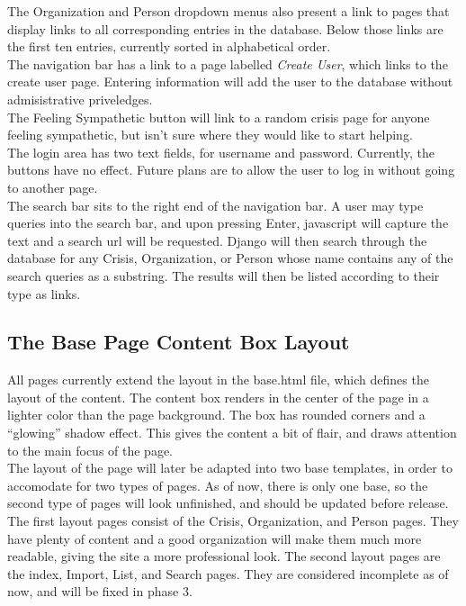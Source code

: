 \documentclass[12pt]{report}
\begin{document}
The Organization and Person dropdown menus also present a link to pages
that display links to all corresponding entries in the database.
Below those links are the first ten entries, currently sorted in alphabetical order.
\\


The navigation bar has a link to a page labelled \emph{Create User}, which links to the
create user page.  Entering information will add the user to the database without
admisistrative priveledges.
\\


The Feeling Sympathetic button will link to a random crisis page for anyone feeling sympathetic,
but isn't sure where they would like to start helping.
\\


The login area has two text fields, for username and password.
Currently, the buttons have no effect.
Future plans are to allow the user to log in without going to another page.
\\


The search bar sits to the right end of the navigation bar.
A user may type queries into the search bar, and upon pressing Enter,
javascript will capture the text and a search url will be requested.
Django will then search through the database for any Crisis, Organization, or Person whose name
contains any of the search queries as a substring.
The results will then be listed according to their type as links.
\\


\subsection*{The Base Page Content Box Layout}
\hfill

All pages currently extend the layout in the base.html file,
which defines the layout of the content.
The content box renders in the center of the page in a lighter color than the page background.
The box has rounded corners and a ``glowing'' shadow effect.
This gives the content a bit of flair, and draws attention to the main focus of the page.
\\


The layout of the page will later be adapted into two base templates,
in order to accomodate for two types of pages.
As of now, there is only one base, so the second type of pages will look unfinished,
and should be updated before release.
The first layout pages consist of the Crisis, Organization, and Person pages.
They have plenty of content and a good organization will make them much more readable,
giving the site a more professional look.
The second layout pages are the index, Import, List, and Search pages.
They are considered incomplete as of now, and will be fixed in phase 3.
\\
\end{document}
